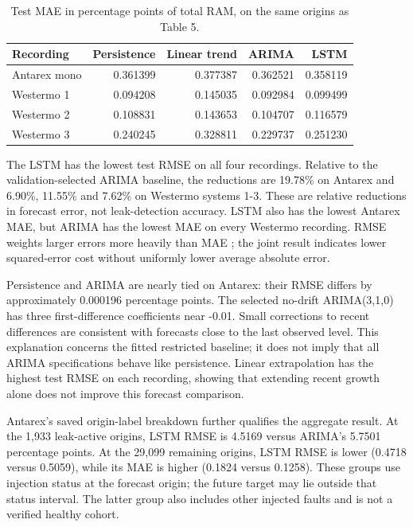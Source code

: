 \documentclass[10pt,a4paper,twocolumn]{article}
\begin{document}
\begin{table}[tbp]
\centering
\caption{Test MAE in percentage points of total RAM, on the same origins as Table 5.}
\label{tab:6}
\fontsize{8.5}{10.2}\selectfont
\setlength{\tabcolsep}{2.4pt}
\renewcommand{\arraystretch}{1.17}
\begin{tabularx}{\linewidth}{@{}L{1.2}R{0.95}R{0.95}R{0.95}R{0.95}@{}}
\toprule
\textbf{Recording} & \textbf{Persistence} & \textbf{Linear trend} & \textbf{ARIMA} & \textbf{LSTM} \\
\midrule
Antarex mono & 0.361399 & 0.377387 & 0.362521 & 0.358119 \\
Westermo 1 & 0.094208 & 0.145035 & 0.092984 & 0.099499 \\
Westermo 2 & 0.108831 & 0.143653 & 0.104707 & 0.116579 \\
Westermo 3 & 0.240245 & 0.328811 & 0.229737 & 0.251230 \\
\bottomrule
\end{tabularx}
\end{table}

The LSTM has the lowest test RMSE on all four recordings. Relative to the validation-selected ARIMA baseline, the reductions are 19.78\% on Antarex and 6.90\%, 11.55\% and 7.62\% on Westermo systems 1-3. These are relative reductions in forecast error, not leak-detection accuracy. LSTM also has the lowest Antarex MAE, but ARIMA has the lowest MAE on every Westermo recording. RMSE weights larger errors more heavily than MAE \cite{ref41}; the joint result indicates lower squared-error cost without uniformly lower average absolute error.

Persistence and ARIMA are nearly tied on Antarex: their RMSE differs by approximately 0.000196 percentage points. The selected no-drift ARIMA(3,1,0) has three first-difference coefficients near -0.01. Small corrections to recent differences are consistent with forecasts close to the last observed level. This explanation concerns the fitted restricted baseline; it does not imply that all ARIMA specifications behave like persistence. Linear extrapolation has the highest test RMSE on each recording, showing that extending recent growth alone does not improve this forecast comparison.

Antarex's saved origin-label breakdown further qualifies the aggregate result. At the 1,933 leak-active origins, LSTM RMSE is 4.5169 versus ARIMA's 5.7501 percentage points. At the 29,099 remaining origins, LSTM RMSE is lower (0.4718 versus 0.5059), while its MAE is higher (0.1824 versus 0.1258). These groups use injection status at the forecast origin; the future target may lie outside that status interval. The latter group also includes other injected faults and is not a verified healthy cohort.
\end{document}
